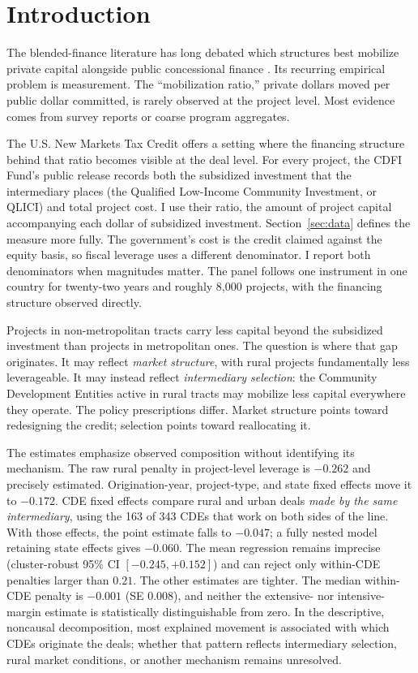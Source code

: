 \section{Introduction}\label{sec:intro}

The blended-finance literature has long debated which structures best
mobilize private capital alongside public concessional finance
\citep{convergence2024, attridge2019, lankes2021}. Its recurring empirical
problem is measurement. The ``mobilization ratio,'' private dollars moved
per public dollar committed, is rarely observed at the project level. Most
evidence comes from survey reports or coarse program aggregates.

The U.S. New Markets Tax Credit offers a setting where the financing
structure behind that ratio becomes visible at the deal level. For every
project, the CDFI Fund's public release records both the subsidized
investment that the intermediary places (the Qualified Low-Income Community
Investment, or QLICI) and total project cost. I use their ratio, the amount
of project capital accompanying each dollar of subsidized investment.
Section~\ref{sec:data} defines the measure more fully. The government's cost
is the credit claimed against the equity basis, so fiscal leverage uses a
different denominator. I report both denominators when magnitudes matter.
The panel follows one instrument in one country for twenty-two years and
roughly 8{,}000 projects, with the financing structure observed directly.

Projects in non-metropolitan tracts carry less capital beyond the subsidized
investment than projects in metropolitan ones. The question is where that
gap originates. It may reflect \emph{market structure}, with rural projects
fundamentally less leverageable. It may instead reflect \emph{intermediary
selection}: the Community Development Entities active in rural tracts may
mobilize less capital everywhere they operate. The policy prescriptions
differ. Market structure points toward redesigning the credit; selection
points toward reallocating it.

The estimates emphasize observed composition without identifying its
mechanism. The raw rural penalty in project-level leverage is $-0.262$ and
precisely estimated. Origination-year, project-type, and state fixed effects
move it to $-0.172$. CDE fixed effects compare rural and urban deals
\emph{made by the same intermediary}, using the 163 of 343 CDEs that work on
both sides of the line. With those effects, the point estimate falls to
$-0.047$; a fully nested model retaining state effects gives $-0.060$. The
mean regression remains imprecise
(cluster-robust 95\% CI $[-0.245, +0.152]$) and can reject only within-CDE
penalties larger than $0.21$. The other estimates are tighter. The median within-CDE penalty is
$-0.001$ (SE $0.008$), and neither the extensive- nor intensive-margin
estimate is statistically distinguishable from zero. In the descriptive,
noncausal decomposition, most explained movement is associated with which
CDEs originate the deals; whether that pattern reflects intermediary
selection, rural market conditions, or another mechanism remains
unresolved.

